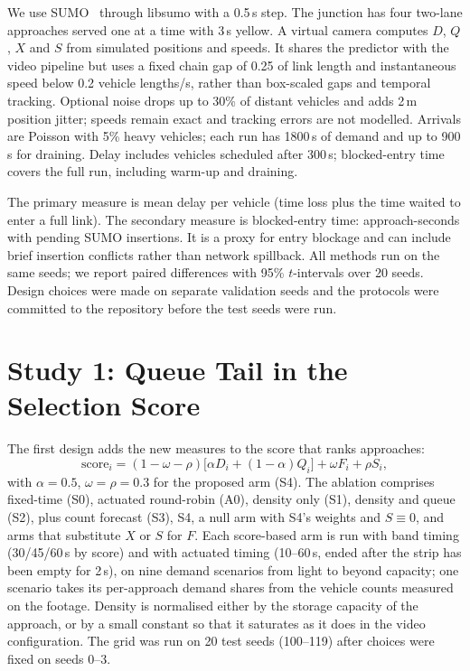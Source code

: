\documentclass[conference]{IEEEtran}
\begin{document}
We use SUMO~\cite{sumo} through libsumo with a 0.5\,s step. The junction has four
two-lane approaches served one at a time with 3\,s yellow. A virtual camera computes
$D$, $Q$, $X$ and $S$ from simulated positions and speeds. It shares the predictor with the video pipeline but uses a fixed chain gap of 0.25 of link length and instantaneous speed below 0.2 vehicle lengths/s, rather than box-scaled gaps and temporal tracking. Optional noise drops up to 30\% of distant vehicles and adds 2\,m position jitter; speeds remain exact and tracking errors are not modelled. Arrivals are Poisson with 5\% heavy vehicles; each run has 1800\,s of demand and up to 900\,s for draining. Delay includes vehicles scheduled after 300\,s; blocked-entry time covers the full run, including warm-up and draining.

The primary measure is mean delay per vehicle (time loss plus the time waited to enter a
full link). The secondary measure is blocked-entry time: approach-seconds with pending SUMO insertions. It is a proxy for entry blockage and can include brief insertion conflicts rather than network spillback. All methods run on the same seeds; we report paired differences with 95\%
$t$-intervals over 20 seeds. Design choices were made on separate validation seeds and
the protocols were committed to the repository before the test seeds were run.

\section{Study 1: Queue Tail in the Selection Score}\label{sec:study1}
The first design adds the new measures to the score that ranks approaches:
\begin{equation}
\mathrm{score}_i=(1-\omega-\rho)\bigl[\alpha D_i+(1-\alpha)Q_i\bigr]+\omega F_i+\rho S_i ,
\end{equation}
with $\alpha=0.5$, $\omega=\rho=0.3$ for the proposed arm (S4). The ablation comprises
fixed-time (S0), actuated round-robin (A0), density only (S1), density and queue (S2),
plus count forecast (S3), S4, a null arm with S4's weights and $S\equiv 0$, and arms that
substitute $X$ or $S$ for $F$. Each score-based arm is run with band timing
(30/45/60\,s by score) and with actuated timing (10--60\,s, ended after the strip has been
empty for 2\,s), on nine demand scenarios from light to beyond capacity; one scenario
takes its per-approach demand shares from the vehicle counts measured on the footage.
Density is normalised either by the storage capacity of the approach, or by a small
constant so that it saturates as it does in the video configuration. The grid was run on
20 test seeds (100--119) after choices were fixed on seeds 0--3.
\end{document}
